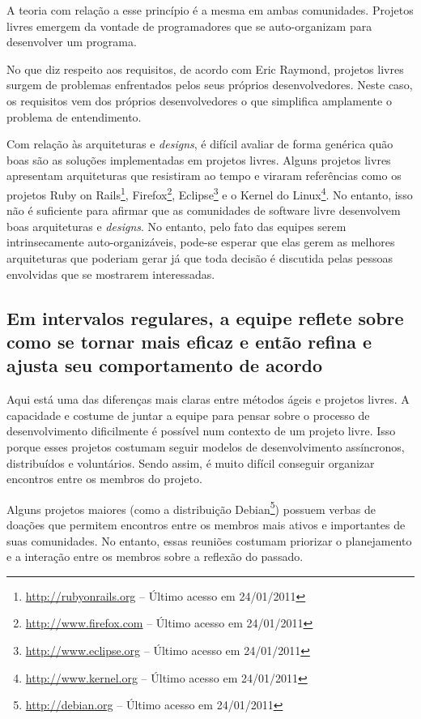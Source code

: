 A teoria com relação a esse princípio é a mesma em ambas
comunidades. Projetos livres emergem da vontade de programadores que
se auto-organizam para desenvolver um programa.

No que diz respeito aos requisitos, de acordo com Eric Raymond,
projetos livres surgem de problemas enfrentados pelos seus próprios
desenvolvedores. Neste caso, os requisitos vem dos próprios
desenvolvedores o que simplifica amplamente o problema de
entendimento.

Com relação às arquiteturas e \textit{designs}, é difícil avaliar de
forma genérica quão boas são as soluções implementadas em projetos
livres. Alguns projetos livres apresentam arquiteturas que resistiram
ao tempo e viraram referências como os projetos Ruby on
Rails\footnote{\url{http://rubyonrails.org} -- Último acesso em
  24/01/2011}, Firefox\footnote{\url{http://www.firefox.com} -- Último
  acesso em 24/01/2011}, Eclipse\footnote{\url{http://www.eclipse.org}
  -- Último acesso em 24/01/2011} e o Kernel do
Linux\footnote{\url{http://www.kernel.org} -- Último acesso em
  24/01/2011}. No entanto, isso não é suficiente para afirmar que as
comunidades de software livre desenvolvem boas arquiteturas e
\textit{designs}. No entanto, pelo fato das equipes serem
intrinsecamente auto-organizáveis, pode-se esperar que elas gerem as
melhores arquiteturas que poderiam gerar já que toda decisão é
discutida pelas pessoas envolvidas que se mostrarem interessadas.

\subsection[Refletir regularmente]{Em intervalos regulares, a equipe
  reflete sobre como se tornar mais eficaz e então refina e ajusta seu
  comportamento de acordo}

Aqui está uma das diferenças mais claras entre métodos ágeis e
projetos livres. A capacidade e costume de juntar a equipe para pensar
sobre o processo de desenvolvimento dificilmente é possível num
contexto de um projeto livre. Isso porque esses projetos costumam
seguir modelos de desenvolvimento assíncronos, distribuídos e
voluntários. Sendo assim, é muito difícil conseguir organizar
encontros entre os membros do projeto.

Alguns projetos maiores (como a distribuição
Debian\footnote{\url{http://debian.org} -- Último acesso em
  24/01/2011}) possuem verbas de doações que permitem encontros entre
os membros mais ativos e importantes de suas comunidades. No entanto,
essas reuniões costumam priorizar o planejamento e a interação entre
os membros sobre a reflexão do passado.


